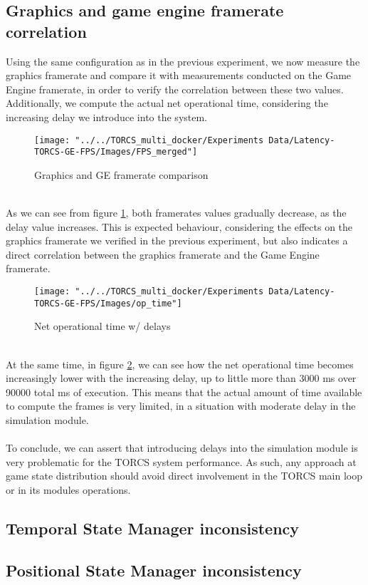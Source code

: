 \subsection{Graphics and game engine framerate correlation}
Using the same configuration as in the previous experiment, we now measure the graphics framerate and compare it with measurements conducted on the Game Engine framerate, in order to verify the correlation between these two values. Additionally, we compute the actual net operational time, considering the increasing delay we introduce into the system.
\begin{figure}[h!]
	\centering
	\texttt{[image: "../../TORCS\_multi\_docker/Experiments Data/Latency-TORCS-GE-FPS/Images/FPS\_merged"]}
	\caption[Graphics and GE framerate comparison]{Graphics and GE framerate comparison}
	\label{fig:graphics-GE-fps}
\end{figure}
\\ As we can see from figure \ref{fig:graphics-GE-fps}, both framerates values gradually decrease, as the delay value increases. This is expected behaviour, considering the effects on the graphics framerate we verified in the previous experiment, but also indicates a direct correlation between the graphics framerate and the Game Engine framerate. \\
\begin{figure}[h!]
	\centering
	\texttt{[image: "../../TORCS\_multi\_docker/Experiments Data/Latency-TORCS-GE-FPS/Images/op\_time"]}
	\caption[Net operational time w/ delays]{Net operational time w/ delays}
	\label{fig:op-time}
\end{figure}
\\ At the same time, in figure \ref{fig:op-time}, we can see how the net operational time becomes increasingly lower with the increasing delay, up to little more than 3000 ms over 90000 total ms of execution. This means that the actual amount of time available to compute the frames is very limited, in a situation with moderate delay in the simulation module. \\ \\
To conclude, we can assert that introducing delays into the simulation module is very problematic for the TORCS system performance. As such, any approach at game state distribution should avoid direct involvement in the TORCS main loop or in its modules operations.

\subsection{Temporal State Manager inconsistency}

\subsection{Positional State Manager inconsistency}